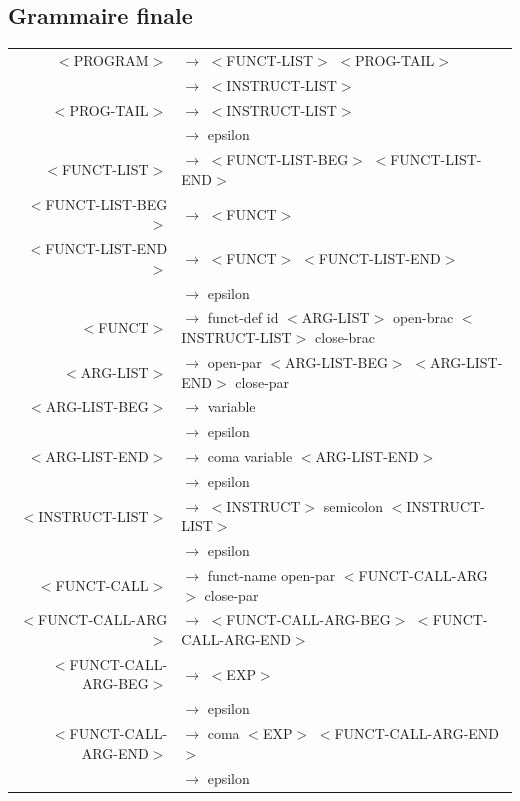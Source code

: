 \documentclass[a4paper,10pt]{article}
\begin{document}
\subsection{Grammaire finale}

\hspace{-3.0cm}\begin{tabular}{rl}	
	$<$PROGRAM$>$				& $\rightarrow$ $<$FUNCT-LIST$>$ $<$PROG-TAIL$>$ \\
								& $\rightarrow$ $<$INSTRUCT-LIST$>$ \\
	$<$PROG-TAIL$>$				& $\rightarrow$ $<$INSTRUCT-LIST$>$ \\
								& $\rightarrow$ epsilon \\
						
	$<$FUNCT-LIST$>$			& $\rightarrow$ $<$FUNCT-LIST-BEG$>$ $<$FUNCT-LIST-END$>$ \\
	$<$FUNCT-LIST-BEG$>$		& $\rightarrow$ $<$FUNCT$>$ \\
	$<$FUNCT-LIST-END$>$		& $\rightarrow$ $<$FUNCT$>$ $<$FUNCT-LIST-END$>$ \\
								& $\rightarrow$ epsilon \\
	$<$FUNCT$>$					& $\rightarrow$ funct-def id $<$ARG-LIST$>$ open-brac $<$INSTRUCT-LIST$>$ close-brac \\
	$<$ARG-LIST$>$				& $\rightarrow$ open-par $<$ARG-LIST-BEG$>$ $<$ARG-LIST-END$>$ close-par\\
	$<$ARG-LIST-BEG$>$			& $\rightarrow$ variable \\
								& $\rightarrow$ epsilon \\
	$<$ARG-LIST-END$>$			& $\rightarrow$ coma variable $<$ARG-LIST-END$>$ \\
								& $\rightarrow$ epsilon \\
	$<$INSTRUCT-LIST$>$			& $\rightarrow$ $<$INSTRUCT$>$ semicolon $<$INSTRUCT-LIST$>$ \\
								& $\rightarrow$ epsilon \\
	$<$FUNCT-CALL$>$			& $\rightarrow$ funct-name open-par $<$FUNCT-CALL-ARG$>$ close-par \\
	$<$FUNCT-CALL-ARG$>$		& $\rightarrow$ $<$FUNCT-CALL-ARG-BEG$>$ $<$FUNCT-CALL-ARG-END$>$ \\
	$<$FUNCT-CALL-ARG-BEG$>$	& $\rightarrow$ $<$EXP$>$ \\
								& $\rightarrow$ epsilon \\
	$<$FUNCT-CALL-ARG-END$>$	& $\rightarrow$ coma $<$EXP$>$ $<$FUNCT-CALL-ARG-END$>$ \\
								& $\rightarrow$ epsilon \\

\end{tabular}
\end{document}
